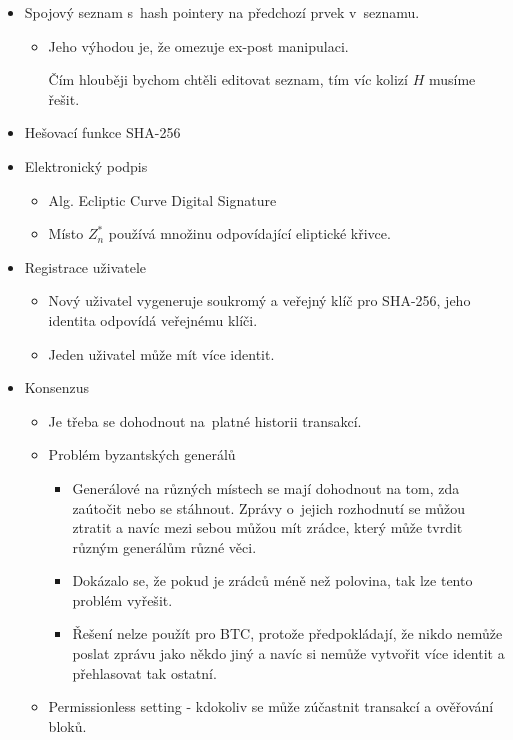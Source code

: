 \documentclass[a4paper,12pt,titlepage]{article}
\begin{document}
\begin{itemize}
\item{Spojový seznam s~hash pointery na předchozí prvek v~seznamu.}
	\begin{itemize}
		\item{Jeho výhodou je, že omezuje ex-post manipulaci.

			Čím hlouběji bychom chtěli editovat seznam, tím víc kolizí \(H\) musíme řešit.}
	\end{itemize}
\item{Hešovací funkce SHA-256}
\item{Elektronický podpis}
	\begin{itemize}
		\item{Alg. Ecliptic Curve Digital Signature}
		\item{Místo \(Z_n^*\) používá množinu odpovídající eliptické křivce.}
	\end{itemize}

\item{Registrace uživatele}
	\begin{itemize}
		\item{Nový uživatel vygeneruje soukromý a veřejný klíč pro SHA-256, jeho identita odpovídá veřejnému klíči.}
		\item{Jeden uživatel může mít více identit.}
	\end{itemize}

\item{Konsenzus}
	\begin{itemize}
		\item{Je třeba se dohodnout na~platné historii transakcí.}
		\item{Problém byzantských generálů}
		\begin{itemize}
			\item{Generálové na různých místech se mají dohodnout na tom, zda zaútočit nebo se stáhnout.
				Zprávy o~jejich rozhodnutí se můžou ztratit a navíc mezi sebou můžou mít zrádce, 
				který může tvrdit různým generálům různé věci. }
			\item{Dokázalo se, že pokud je zrádců méně než polovina, tak lze tento problém vyřešit.}
			\item{Řešení nelze použít pro BTC, protože předpokládají, 
				že nikdo nemůže poslat zprávu jako někdo jiný 
				a navíc si nemůže vytvořit více identit a přehlasovat tak ostatní.}
		\end{itemize}
		\item{Permissionless setting - kdokoliv se může zúčastnit transakcí a ověřování bloků.}
		
	\end{itemize}
\end{itemize}
\end{document}
